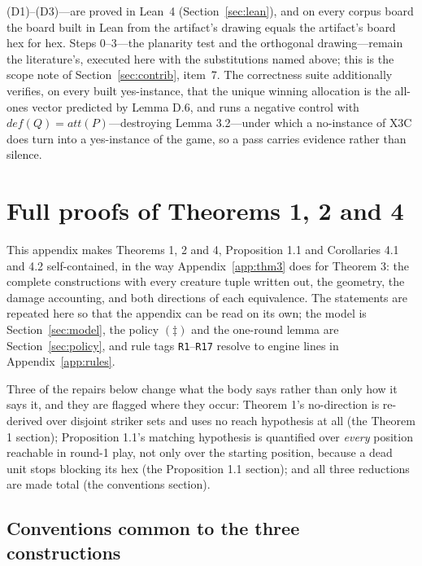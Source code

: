 \documentclass[11pt,a4paper]{article}
\theoremstyle{plain}
\theoremstyle{definition}
\theoremstyle{plain}
\theoremstyle{definition}
\theoremstyle{remark}
\begin{document}
(D1)--(D3)---are proved in Lean~4 (Section~\ref{sec:lean}), and on every corpus board the
board built in Lean from the artifact's drawing equals the artifact's board hex for hex. Steps
0--3---the planarity test and the orthogonal drawing---remain the literature's, executed here
with the substitutions named above; this is the scope note of Section~\ref{sec:contrib},
item~7. The correctness suite additionally verifies, on every built yes-instance,
that the unique winning allocation is the all-ones vector predicted by Lemma D.6, and runs a
negative control with $\mathit{def}(Q)=\mathit{att}(P)$---destroying Lemma 3.2---under which a
no-instance of \textsc{X3C} does turn into a yes-instance of the game, so a pass carries evidence
rather than silence.

\section{Full proofs of Theorems 1, 2 and 4}\label{app:thm124}

This appendix makes Theorems 1, 2 and 4, Proposition 1.1 and Corollaries 4.1 and 4.2
self-contained, in the way Appendix~\ref{app:thm3} does for Theorem 3: the complete
constructions with every creature tuple written out, the geometry, the damage accounting,
and both directions of each equivalence. The statements are repeated here so that the
appendix can be read on its own; the model is Section~\ref{sec:model}, the policy
$(\ddagger)$ and the one-round lemma are Section~\ref{sec:policy}, and rule tags
\texttt{R1}--\texttt{R17} resolve to engine lines in Appendix~\ref{app:rules}.

Three of the repairs below change what the body says rather than only how it says it, and
they are flagged where they occur: Theorem 1's no-direction is re-derived over disjoint
striker sets and uses no reach hypothesis at all (the Theorem 1 section); Proposition
1.1's matching hypothesis is quantified over \emph{every} position reachable in round-1
play, not only over the starting position, because a dead unit stops blocking its hex
(the Proposition 1.1 section); and all three reductions are made total (the conventions
section).

\subsection*{Conventions common to the three constructions}
\end{document}
